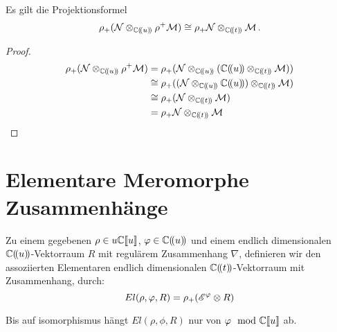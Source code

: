 \begin{thm} \label{thm:Projektionsformel}
\cite[1.a]{sabbah_Fourier-local}
Es gilt die Projektionsformel
\begin{equation} \label{eq:Projektionsformel}
\rho_+(\mathcal{N}\otimes_{\mathbb{C}(\!(u)\!)}\rho^+\mathcal{M}) \cong
\rho_+\mathcal{N}\otimes_{\mathbb{C}(\!(t)\!)}\mathcal{M}\,.
\end{equation}
\end{thm}
\begin{proof}
\begin{align*}
\rho_+(\cN\otimes_{\C(\!(u)\!)}\rho^+\cM) &=
\rho_+(\cN\otimes_{\C(\!(u)\!)}(\C(\!(u)\!)\otimes_{\C(\!(t)\!)}\cM)) \\
&\cong \rho_+((\cN\otimes_{\C(\!(u)\!)}\C(\!(u)\!))
\otimes_{\C(\!(t)\!)}\cM) \\
&\cong \rho_+(\cN\otimes_{\C(\!(t)\!)}\cM) \\
&= \rho_+\cN\otimes_{\C(\!(t)\!)}\cM \\
\end{align*}
\end{proof}

\begin{comment}
Sei $\rho(u)=u^p=t$ und $\phi(t)$ gegeben.
\begin{align*}
\rho^+\sE^{\phi(t)}&=\sE^{\phi(\rho(u))}=\sE^{\phi(u^p)}\\
\rho^+\rho_+\sE^{\phi(u)}
&=\underset{\zeta\in\mu_p}{\bigoplus}\sE^{\phi(\zeta\cdot u)}\\
\end{align*}
\end{comment}

\section{Elementare Meromorphe Zusammenhänge}

\begin{defn}
\cite[Def 2.1]{sabbah_Fourier-local}
\begin{comment}
Alternative. ausfürlichere / komplexe definition \cite[Def 5.4.5.]{sabbah_cimpa90}
\end{comment}
Zu einem gegebenen $\rho\in u\mathbb{C}\llbracket u\rrbracket$,
$\varphi\in\mathbb{C}(\!(u)\!)$ und einem endlich dimensionalen
$\mathbb{C}(\!(u)\!)$-Vektorraum $R$ mit regulärem Zusammenhang $\nabla$,
definieren wir den assoziierten Elementaren endlich dimensionalen
$\mathbb{C}(\!(t)\!)$-Vektorraum mit Zusammenhang, durch:
\[
El(\rho,\varphi,R)=\rho_+(\mathscr{E}^\varphi\otimes R)
\]
\end{defn}
\cite[nach Def 2.1]{sabbah_Fourier-local}
Bis auf isomorphismus hängt $El(\rho,\phi,R)$ nur von $\varphi\mod{{\mathbb C\llbracket u\rrbracket}}$ ab.
\begin{lem}
\cite[Lem 2.2]{sabbah_Fourier-local}
\end{lem}

